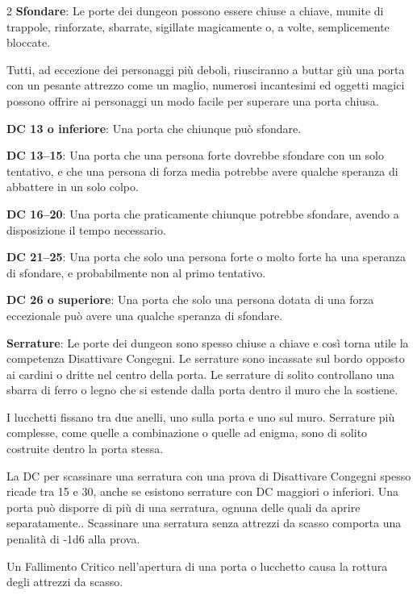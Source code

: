 \begin{multicols}{2}
\textbf{Sfondare}: Le porte dei dungeon possono essere chiuse a chiave, munite di trappole, rinforzate, sbarrate, sigillate magicamente o, a volte, semplicemente bloccate.

Tutti, ad eccezione dei personaggi più deboli, riusciranno a buttar giù una porta con un pesante attrezzo come un maglio, numerosi incantesimi ed oggetti magici possono offrire ai personaggi un modo facile per superare una porta chiusa.

\textbf{DC 13 o inferiore}: Una porta che chiunque può sfondare.

\textbf{DC 13--15}: Una porta che una persona forte dovrebbe sfondare con un solo tentativo, e che una persona di forza media potrebbe avere qualche speranza di abbattere in un solo colpo.

\textbf{DC 16--20}: Una porta che praticamente chiunque potrebbe sfondare, avendo a disposizione il tempo necessario.

\textbf{DC 21--25}: Una porta che solo una persona forte o molto forte ha una speranza di sfondare, e probabilmente non al primo tentativo.

\textbf{DC 26 o superiore}: Una porta che solo una persona dotata di una forza eccezionale può avere una qualche speranza di sfondare.

\textbf{Serrature}: Le porte dei dungeon sono spesso chiuse a chiave e così torna utile la competenza Disattivare Congegni. Le serrature sono incassate sul bordo opposto ai cardini o dritte nel centro della porta. Le serrature di solito controllano una sbarra di ferro o legno che si estende dalla porta dentro il muro che la sostiene.

I lucchetti fissano tra due anelli, uno sulla porta e uno sul muro. Serrature più complesse, come quelle a combinazione o quelle ad enigma, sono di solito costruite dentro la porta stessa.

La DC per scassinare una serratura con una prova di Disattivare Congegni spesso ricade tra 15 e 30, anche se esistono serrature con DC maggiori o inferiori. Una porta può disporre di più di una serratura, ognuna delle quali da aprire separatamente.. Scassinare una serratura senza attrezzi da scasso comporta una penalità di -1d6 alla prova.\hypertarget{Attrezzi da scasso}{}

Un Fallimento Critico nell'apertura di una porta o lucchetto causa la rottura degli attrezzi da scasso.


\end{multicols}
